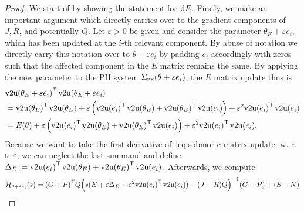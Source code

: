 

\begin{proof}

    We start of by showing the statement for $\mathop{}\!\mathrm{d} E$.
    Firstly, we make an important argument which directly carries over to the gradient components of $J, R$, and potentially $Q$.
    Let $\varepsilon > 0$ be given and consider the parameter $\theta_E + \varepsilon e_i$, which has been updated at the $i$-th relevant component.
    By abuse of notation we directly carry this notation over to $\theta + \varepsilon e_i$ by padding $e_i$ accordingly with zeros such that the affected component in the $E$ matrix remains the same.
    By applying the new parameter to the \ac{PH} system $\Sigma_{\textnormal{\scshape ph}}(\theta + \varepsilon e_i)$, the $E$ matrix update thus is
    \begin{equation}\label{eq:sobmor-e-matrix-update}
        \begin{aligned}
            &{\vecupper(\theta_E + \varepsilon e_i)}\trans \vecupper(\theta_E + \varepsilon e_i) \\
             &= {\vecupper(\theta_E)}\trans \vecupper(\theta_E) + \varepsilon \left( {\vecupper(e_i)}\trans \vecupper(\theta_E) + {\vecupper(\theta_E)}\trans \vecupper(e_i) \right) + \varepsilon^2 {\vecupper(e_i)}\trans \vecupper(e_i) \\
             &= E(\theta) + \varepsilon \left( {\vecupper(e_i)}\trans \vecupper(\theta_E) + {\vecupper(\theta_E)}\trans \vecupper(e_i) \right) + \varepsilon^2 {\vecupper(e_i)}\trans \vecupper(e_i).
        \end{aligned}
    \end{equation}
    Because we want to take the first derivative of~\eqref{eq:sobmor-e-matrix-update} w\@. r\@. t\@. $\varepsilon$, we can neglect the last summand and define $\Delta_E \coloneqq {\mathop{}\!\mathrm{v}2\mathrm{u}(e_i)}^{\mkern1mu \mathsf{T}} \mathop{}\!\mathrm{v}2\mathrm{u}(\theta_E) + {\mathop{}\!\mathrm{v}2\mathrm{u}(\theta_E)}^{\mkern1mu \mathsf{T}} \mathop{}\!\mathrm{v}2\mathrm{u}(e_i)$.
    Afterwards, we compute
    \begin{equation}\label{eq:sobmor-e-variation}
        \begin{aligned}
            \mcl{H}_{\theta + \varepsilon e_i}(s) &= {(G + P)}\trans Q {\left( s (E + \varepsilon \Delta_E + \varepsilon^2 {\vecupper(e_i)}\trans \vecupper(e_i)) - (J - R) Q \right)}\inv (G - P) + (S - N) \\

\end{aligned}
\end{equation}
\end{proof}
